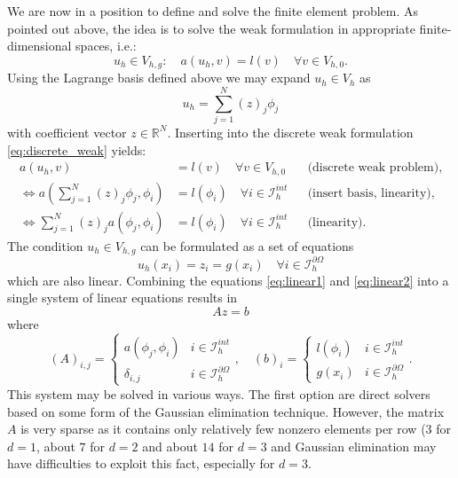 \documentclass[a4paper,12pt]{article}
\begin{document}
We are now in a position to define and solve the finite element problem.
As pointed out above, the idea is to solve the weak formulation in appropriate
finite-dimensional spaces, i.e.:
\begin{equation*}
u_h\in V_{h,g} : \quad a(u_h,v) = l(v) \quad \forall v\in V_{h,0} .
\label{eq:discrete_weak}
\end{equation*}
Using the Lagrange basis defined above we may expand $u_h\in V_h$ as
\begin{equation*}
u_h = \sum_{j=1}^N (z)_j \phi_j
\end{equation*} 
with coefficient vector $z\in\mathbb{R}^N$. Inserting into the
discrete weak formulation \eqref{eq:discrete_weak} yields:
\begin{align}
a(u_h,v) &= l(v) \quad \forall v\in V_{h,0} &&\text{(discrete weak problem)},\nonumber \\
\Leftrightarrow 
a\left(\sum_{j=1}^N (z)_j \phi_j,\phi_i\right) &= l(\phi_i) \quad \forall i\in \mathcal{I}_h^{int} 
&&\text{(insert basis, linearity)}, \nonumber \\
\Leftrightarrow 
\sum_{j=1}^N (z)_j a\left( \phi_j,\phi_i\right) &= l(\phi_i) \quad \forall i\in \mathcal{I}_h^{int} 
&&\text{(linearity)}. \label{eq:linear1}
\end{align}
The condition $u_h\in V_{h,g}$ can be formulated as a set of equations
\begin{equation}
u_h(x_i) = z_i = g(x_i) \quad\forall i\in\mathcal{I}_h^{\partial\Omega}
\label{eq:linear2}
\end{equation}
which are also linear. Combining the equations \eqref{eq:linear1} and \eqref{eq:linear2}
into a single system of linear equations results in
\begin{equation}
A z = b \label{eq:thesystem}
\end{equation}
where
\begin{equation}
(A)_{i,j} = \left\{\begin{array}{ll}
a(\phi_j,\phi_i) & i\in\mathcal{I}_h^{int}\\
\delta_{i,j} & i\in\mathcal{I}_h^{\partial\Omega}
\end{array}\right., \quad
(b)_{i} = \left\{\begin{array}{ll}
l(\phi_i) & i\in\mathcal{I}_h^{int}\\
g(x_i) & i\in\mathcal{I}_h^{\partial\Omega}
\end{array}\right. .
\label{eq:systemdetail}
\end{equation}
This system may be solved in various ways. The first option are direct solvers
based on some form of the Gaussian elimination technique. However, the matrix $A$
is very sparse as it contains only relatively few nonzero elements per row (3 for $d=1$,
about $7$ for $d=2$ and about $14$ for $d=3$ and Gaussian elimination
may have difficulties to exploit this fact, especially for $d=3$.
\end{document}
